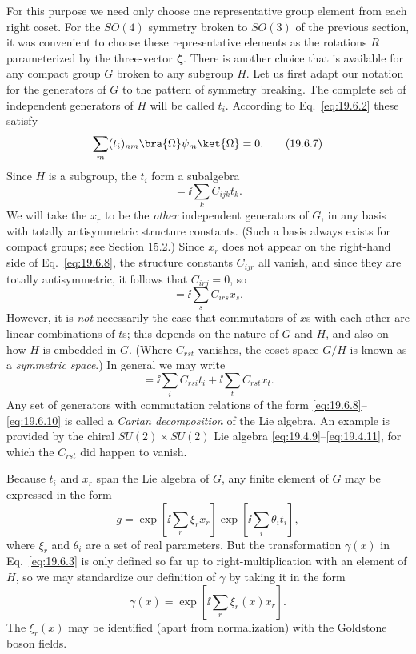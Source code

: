 For this purpose we need only choose one representative group element from each right coset. For the $SO(4)$ symmetry broken to $SO(3)$ of the previous section, it was convenient to choose these representative elements as the rotations $R$ parameterized by the three-vector $\boldsymbol\zeta$. There is another choice that is available for any compact group $G$ broken to any subgroup $H$. Let us first adapt our notation for the generators of $G$ to the pattern of symmetry breaking. The complete set of independent generators of $H$ will be called $t_i$. According to Eq.~\eqref{eq:19.6.2} these satisfy
\begin{equation}
\sum_m(t_i)_{nm}\bra{\Omega}\psi_m\ket{\Omega}=0.
\tag{19.6.7}\label{eq:19.6.7}
\end{equation}
Since $H$ is a subgroup, the $t_i$ form a subalgebra
\begin{equation}
[t_i,t_j]=\ii\sum_k C_{ijk}t_k.
\tag{19.6.8}\label{eq:19.6.8}
\end{equation}
We will take the $x_r$ to be the \emph{other} independent generators of $G$, in any basis with totally antisymmetric structure constants. (Such a basis always exists for compact groups; see Section 15.2.) Since $x_r$ does not appear on the right-hand side of Eq.~\eqref{eq:19.6.8}, the structure constants $C_{ijr}$ all vanish, and since they are totally antisymmetric, it follows that $C_{irj}=0$, so
\begin{equation}
[t_i,x_r]=\ii\sum_s C_{irs}x_s.
\tag{19.6.9}\label{eq:19.6.9}
\end{equation}
However, it is \emph{not} necessarily the case that commutators of $x$s with each other are linear combinations of $t$s; this depends on the nature of $G$ and $H$, and also on how $H$ is embedded in $G$. (Where $C_{rst}$ vanishes, the coset space $G/H$ is known as a \emph{symmetric space}.) In general we may write
\begin{equation}
[x_r,x_s]
=\ii\sum_i C_{rsi}t_i+\ii\sum_t C_{rst}x_t.
\tag{19.6.10}\label{eq:19.6.10}
\end{equation}
Any set of generators with commutation relations of the form \eqref{eq:19.6.8}--\eqref{eq:19.6.10} is called a \emph{Cartan decomposition} of the Lie algebra. An example is provided by the chiral $SU(2)\times SU(2)$ Lie algebra \eqref{eq:19.4.9}--\eqref{eq:19.4.11}, for which the $C_{rst}$ did happen to vanish.

Because $t_i$ and $x_r$ span the Lie algebra of $G$, any finite element of $G$ may be expressed in the form
\begin{equation}
g=\exp\left[\ii\sum_r\xi_r x_r\right]
\exp\left[\ii\sum_i\theta_i t_i\right],
\tag{19.6.11}\label{eq:19.6.11}
\end{equation}
where $\xi_r$ and $\theta_i$ are a set of real parameters. But the transformation $\gamma(x)$ in Eq.~\eqref{eq:19.6.3} is only defined so far up to right-multiplication with an element of $H$, so we may standardize our definition of $\gamma$ by taking it in the form
\begin{equation}
\gamma(x)=\exp\left[\ii\sum_r\xi_r(x)x_r\right].
\tag{19.6.12}\label{eq:19.6.12}
\end{equation}
The $\xi_r(x)$ may be identified (apart from normalization) with the Goldstone boson fields.

